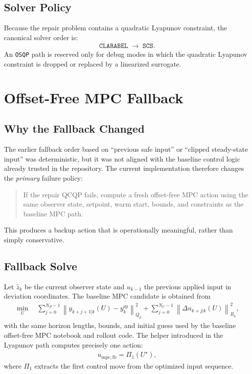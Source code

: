 \documentclass[11pt]{article}
\begin{document}
\subsection{Solver Policy}
Because the repair problem contains a quadratic Lyapunov constraint, the canonical solver order is:
\begin{align}
\texttt{CLARABEL} \;\rightarrow\; \texttt{SCS}. 
\end{align}
An \texttt{OSQP} path is reserved only for debug modes in which the quadratic Lyapunov constraint is dropped or replaced by a linearized surrogate.

\section{Offset-Free MPC Fallback}
\subsection{Why the Fallback Changed}
The earlier fallback order based on ``previous safe input'' or ``clipped steady-state input'' was deterministic, but it was not aligned with the baseline control logic already trusted in the repository. The current implementation therefore changes the \emph{primary} failure policy:
\begin{quote}
If the repair QCQP fails, compute a fresh offset-free MPC action using the same observer state, setpoint, warm start, bounds, and constraints as the baseline MPC path.
\end{quote}
This produces a backup action that is operationally meaningful, rather than simply conservative.

\subsection{Fallback Solve}
Let $\hat z_k$ be the current observer state and $u_{k-1}$ the previous applied input in deviation coordinates. The baseline MPC candidate is obtained from
\begin{align}
\min_{U}
\quad
\sum_{j=0}^{N_P-1}
\left\|
y_{k+j+1|k}(U) - y_k^{\mathrm{sp}}
\right\|_{Q_y}^2
+
\sum_{j=0}^{N_C-1}
\left\|
\Delta u_{k+j|k}(U)
\right\|_{R_u}^2, \label{eq:mpc_obj}
\end{align}
with the same horizon lengths, bounds, and initial guess used by the baseline offset-free MPC notebook and rollout code. The helper introduced in the Lyapunov path computes precisely one action:
\begin{align}
u_{\mathrm{mpc,fb}} = \Pi_1(U^\star), \label{eq:first_move}
\end{align}
where $\Pi_1$ extracts the first control move from the optimized input sequence.
\end{document}
